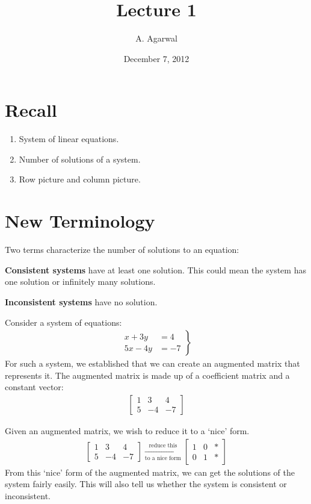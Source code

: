 \documentclass[11pt]{article}
\title{Lecture 1}
\author{A. Agarwal}
\date{December 7, 2012}
\newcommand{\keyphrase}{\textbf}
\begin{document}

\section*{Recall}
\begin{enumerate}
\item{
System of linear equations.
}
\item{
Number of solutions of a system.
}
\item{
Row picture and column picture.
}
\end{enumerate}

\section*{New Terminology}
Two terms characterize the number of solutions to an equation:

\keyphrase{Consistent systems} have at least one solution. This could mean the system has one solution or infinitely many solutions.

\keyphrase{Inconsistent systems} have no solution.


Consider a system of equations:
\begin{align*}
\left.
\begin{aligned}
x + 3y &= 4
\\
5x - 4y &= -7
\end{aligned}
\right\}
\end{align*}
For such a system, we established that we can create an augmented matrix that represents it. The augmented matrix is made up of a coefficient matrix and a constant vector:
\begin{align*}
\left[
\begin{matrix}
1 & 3 & 4
\\
5 & -4 & -7
\end{matrix}
\right]
\end{align*}

Given an augmented matrix, we wish to reduce it to a `nice' form.
\begin{align*}
\left[
\begin{matrix}
1 & 3 & 4
\\
5 & -4 & -7
\end{matrix}
\right]
\xrightarrow[\text{to a nice form}]{\text{reduce this}}
\left[
\begin{matrix}
1 & 0 & *
\\
0 & 1 & *
\end{matrix}
\right]
\end{align*}
From this `nice' form of the augmented matrix, we can get the solutions of the system fairly easily. This will also tell us whether the system is consistent or inconsistent.
\end{document}
